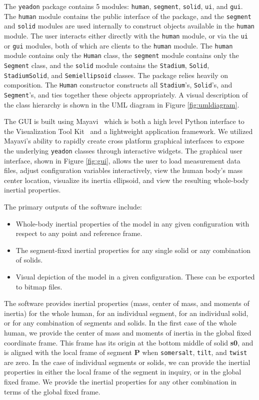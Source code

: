 \documentclass[10pt]{article}
\begin{document}
The \verb+yeadon+ package contains 5 modules: \verb+human+, \verb+segment+,
\verb+solid+, \verb+ui+, and \verb+gui+. The \verb+human+ module contains the
public interface of the package, and the \verb+segment+ and \verb+solid+
modules are used internally to construct objects available in the
\verb+human+ module. The user interacts either directly with the \verb+human+
module, or via the \verb+ui+ or \verb+gui+ modules, both of which are clients
to the \verb+human+ module. The \verb+human+ module contains only the
\verb+Human+ class, the \verb+segment+ module contains only the \verb+Segment+
class, and the \verb+solid+ module contains the \verb+Stadium+, \verb+Solid+,
\verb+StadiumSolid+, and \verb+Semiellipsoid+ classes. The package relies
heavily on composition. The \verb+Human+ constructor constructs all
\verb+Stadium+'s, \verb+Solid+'s, and \verb+Segment+'s, and ties together these
objects appropriately. A visual description of the class hierarchy is shown in
the UML diagram in Figure \ref{fig:umldiagram}.

The GUI is built using Mayavi~\cite{Ramachandran2011} which is both a high
level Python interface to the Visualization Tool Kit~\cite{Schroeder2006} and
a lightweight application framework. We utilized Mayavi's ability to rapidly
create cross platform graphical interfaces to expose the underlying
\verb+yeadon+ classes through interactive widgets. The graphical user
interface, shown in Figure \ref{fig:gui}, allows the user to load measurement
data files, adjust configuration variables interactively, view the human body's
mass center location, visualize its inertia ellipsoid, and view the resulting
whole-body inertial properties.

The primary outputs of the software include:

\begin{itemize}
  \item Whole-body inertial properties of the model in any given configuration
      with respect to any point and reference frame.
  \item The segment-fixed inertial properties for any single solid or any
    combination of solids.
  \item Visual depiction of the model in a given configuration. These can be
    exported to bitmap files.
\end{itemize}

The software provides inertial properties (mass, center of mass, and moments of
inertia) for the whole human, for an individual segment, for an individual
solid, or for any combination of segments and solids. In the first case of the
whole human, we provide the center of mass and moments of inertia in the global
fixed coordinate frame. This frame has its origin at the bottom middle of solid
\textbf{s0}, and is aligned with the local frame of segment \textbf{P} when
\verb+somersalt+, \verb+tilt+, and \verb+twist+ are zero. In the case of
individual segments or solids, we can provide the inertial properties in either
the local frame of the segment in inquiry, or in the global fixed frame. We
provide the inertial properties for any other combination in terms of the
global fixed frame.
\end{document}
